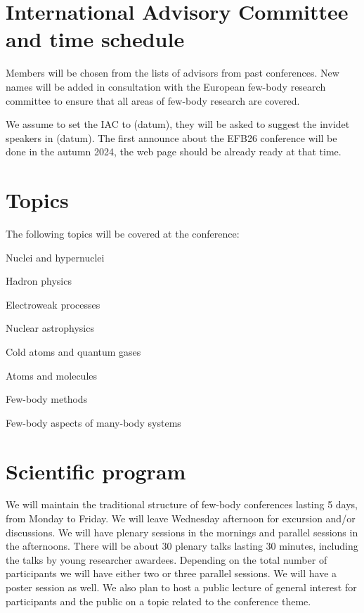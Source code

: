 \documentclass[12pt]{extarticle}
\newcommand*\sq{\mathbin{\vcenter{\hbox{\rule{.8ex}{.8ex}}}}}
\newenvironment{t_sq_itemize}
{\begin{itemize}[topsep=0pt, parsep=0pt, itemsep=0pt, leftmargin=*]
    \renewcommand{\labelitemi}{{\(\sq\)}}}
  {\end{itemize}}
\begin{document}
\section*{International Advisory Committee and time schedule}
\noindent
%
Members will be chosen from the lists of advisors from past conferences. New names
will be added in consultation with the European few-body research committee to ensure that all
areas of few-body research are covered. 

We assume to set the IAC to (datum), they will be asked to suggest the invidet speakers in (datum). 
The first announce about the EFB26 conference will be done in the autumn 2024, the web page
should be already ready at that time.

\section*{Topics}
\noindent
The following topics will be covered at the conference:
\begin{t_sq_itemize}
\item Nuclei and hypernuclei
\item Hadron physics
\item Electroweak processes
\item Nuclear astrophysics
\item Cold atoms and quantum gases
\item Atoms and molecules
\item Few-body methods
\item Few-body aspects of many-body systems
\end{t_sq_itemize}

\section*{Scientific program}
\noindent
We will maintain the traditional structure of few-body conferences lasting 5 days, from Monday
to Friday. We will leave Wednesday afternoon for excursion and/or discussions. We will have plenary sessions
in the mornings and parallel sessions in the afternoons. There will be about 30 plenary talks lasting
30 minutes, including the talks by young researcher awardees. Depending on the total number of
participants we will have either two or three parallel sessions. We will have a poster session as well.
We also plan to host a public lecture of general interest for participants and the public on a topic related
to the conference theme. 
\end{document}
